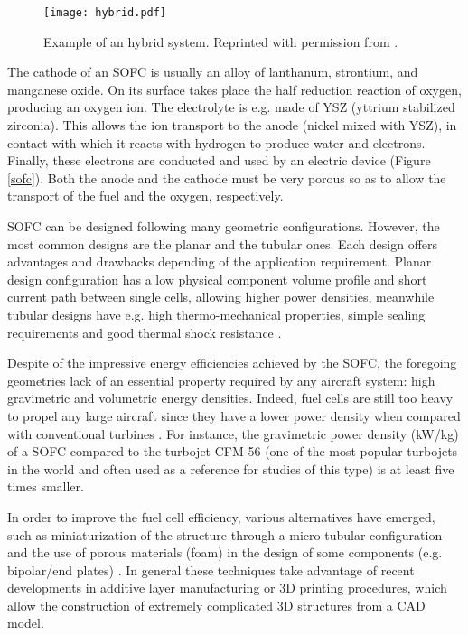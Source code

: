 \documentclass{article}
\begin{document}
\begin{figure}[hbt]
\centering
\texttt{[image: hybrid.pdf]}
\caption{Example of an hybrid system. Reprinted with permission from \cite{etienne}.}\label{hybrid}
\end{figure}

The cathode of an SOFC is usually an alloy of lanthanum, strontium, and manganese oxide. On its surface takes place the half reduction reaction of oxygen, producing an oxygen ion. The electrolyte is e.g. made of YSZ (yttrium stabilized zirconia). This allows the ion transport to the anode (nickel mixed with YSZ), in contact with which it reacts with hydrogen to produce water and electrons. Finally, these electrons are conducted and used by an electric device (Figure \ref{sofc}). Both the anode and the cathode must be very porous so as to allow the transport of the fuel and the oxygen, respectively. 


SOFC can be designed following many geometric configurations. However, the most common designs are the planar and the tubular ones. Each design offers advantages and drawbacks depending of the application requirement. Planar design configuration has a low physical component volume profile and short current path between single cells, allowing higher power densities, meanwhile tubular designs have e.g. high thermo-mechanical properties, simple sealing requirements and good thermal shock resistance \cite{de2011production}.  


Despite of the impressive energy efficiencies achieved by the SOFC, the foregoing geometries lack of an essential property required by any aircraft system: high gravimetric and volumetric energy densities. Indeed, fuel cells are still too heavy to propel any large aircraft since they have a lower power density when compared with conventional turbines \cite{hordeski2009hydrogen}. For instance, the gravimetric power density (kW/kg) of a SOFC compared to the turbojet CFM-56 (one of the most popular turbojets in the world and often used as a reference for studies of this type) is at least five times smaller.  


In order to improve the fuel cell efficiency, various alternatives have emerged, such as miniaturization of the structure through a micro-tubular configuration \cite{de2011production} and the use of porous materials (foam) in the design of some components (e.g. bipolar/end plates) \cite{kumar2003modeling}. In general these techniques take advantage 
of recent developments in additive layer manufacturing or 3D printing procedures, which allow the construction of extremely complicated 3D structures from a CAD model.
\end{document}
